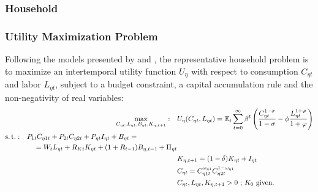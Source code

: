 \documentclass[../thesis.tex]{subfiles}
\begin{document}
\newpage




\subsubsection{Household}

\subsubsection*{Utility Maximization Problem}

Following the models presented by \textcite{costa_junior_understanding_2016} and \textcite{solis-garcia_ucb_2022}, the representative household problem is to maximize an intertemporal utility function $U_{\eta}$ with respect to consumption $C_{\eta t}$ and labor $L_{\eta t}$, subject to a budget constraint, a capital accumulation rule and the non-negativity of real variables:
\begin{align}
	\max_{C_{\eta t}, L_{\eta t}, B_{\eta t}, K_{\eta, t+1}}: \quad & U_{\eta}(C_{\eta t},L_{\eta t}) = {\mathbb{E}_{t}} \sum_{t=0}^{\infty} \beta^t \left(\frac{C_{\eta t}^{1-\sigma}}{1-\sigma} - \phi \frac{L_{\eta t}^{1+\varphi}}{1+\varphi} \right) \label{eq_v2:reg-utility-function-0} 
	\\
	\begin{split}
		\operatorname{s.t.}: \quad & P_{1 t} C_{\eta 1 t} + P_{2 t} C_{\eta 2 t} + P_{\eta t} I_{\eta t} + B_{\eta t} = \\ & \quad = W_t L_{\eta t} + R_{Kt} K_{\eta t} + (1 + R_{t-1}) B_{\eta,t-1} + \Pi_{\eta t}
	\end{split} \label{eq_v2:reg-budget-constraint} \\
	\quad & K_{\eta, t+1} = (1-\delta)K_{\eta t} + I_{\eta t} \label{eq_v2:reg-law-of-motion-for-capital} \\
	\quad & C_{\eta t} = C_{\eta 1 t}^{\omega_{\eta 1}} C_{\eta 2 t}^{1-\omega_{\eta 1}} \label{eq_v2:reg-consumption-aggregation} \\
	\quad & C_{\eta t}, L_{\eta t}, K_{\eta, t+1} > 0 \text{ ; $K_0$ given.} \nonumber
\end{align}
\end{document}
